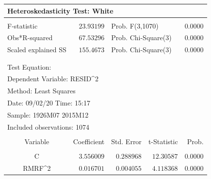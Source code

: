\documentclass[12pt]{article}
\numberwithin{equation}{section} %
\begin{document}
\begin{table}[H]
\centering
\begin{tabular}{lrrrr}
\multicolumn{3}{l}{Heteroskedasticity Test: White}&\multicolumn{1}{c}{}&\multicolumn{1}{c}{}\\
[4.5pt] \hline \\ [-4.5pt]
\multicolumn{1}{l}{F-statistic}&\multicolumn{1}{r}{$23.93199$}&\multicolumn{2}{l}{Prob. F(3,1070)}&\multicolumn{1}{r}{$0.0000$}\\
\multicolumn{1}{l}{Obs*R-squared}&\multicolumn{1}{r}{$67.53296$}&\multicolumn{2}{l}{Prob. Chi-Square(3)}&\multicolumn{1}{r}{$0.0000$}\\
\multicolumn{1}{l}{Scaled explained SS}&\multicolumn{1}{r}{$155.4673$}&\multicolumn{2}{l}{Prob. Chi-Square(3)}&\multicolumn{1}{r}{$0.0000$}\\
[4.5pt] \hline \\ [-4.5pt]
\multicolumn{1}{c}{}&\multicolumn{1}{c}{}&\multicolumn{1}{c}{}&\multicolumn{1}{c}{}&\multicolumn{1}{c}{}\\
\multicolumn{2}{l}{Test Equation:}&\multicolumn{1}{c}{}&\multicolumn{1}{c}{}&\multicolumn{1}{c}{}\\
\multicolumn{3}{l}{Dependent Variable: RESID\textasciicircum 2}&\multicolumn{1}{c}{}&\multicolumn{1}{c}{}\\
\multicolumn{2}{l}{Method: Least Squares}&\multicolumn{1}{c}{}&\multicolumn{1}{c}{}&\multicolumn{1}{c}{}\\
\multicolumn{2}{l}{Date: 09/02/20   Time: 15:17}&\multicolumn{1}{c}{}&\multicolumn{1}{c}{}&\multicolumn{1}{c}{}\\
\multicolumn{2}{l}{Sample: 1926M07 2015M12}&\multicolumn{1}{c}{}&\multicolumn{1}{c}{}&\multicolumn{1}{c}{}\\
\multicolumn{3}{l}{Included observations: 1074}&\multicolumn{1}{c}{}&\multicolumn{1}{c}{}\\
[4.5pt] \hline \\ [-4.5pt]
\multicolumn{1}{c}{Variable}&\multicolumn{1}{r}{Coefficient}&\multicolumn{1}{r}{Std. Error}&\multicolumn{1}{r}{t-Statistic}&\multicolumn{1}{r}{Prob.}\\
[4.5pt] \hline \\ [-4.5pt]
\multicolumn{1}{c}{C}&\multicolumn{1}{r}{$3.556009$}&\multicolumn{1}{r}{$0.288968$}&\multicolumn{1}{r}{$12.30587$}&\multicolumn{1}{r}{$0.0000$}\\
\multicolumn{1}{c}{RMRF\textasciicircum 2}&\multicolumn{1}{r}{$0.016701$}&\multicolumn{1}{r}{$0.004055$}&\multicolumn{1}{r}{$4.118368$}&\multicolumn{1}{r}{$0.0000$}\\

\end{tabular}
\end{table}
\end{document}

